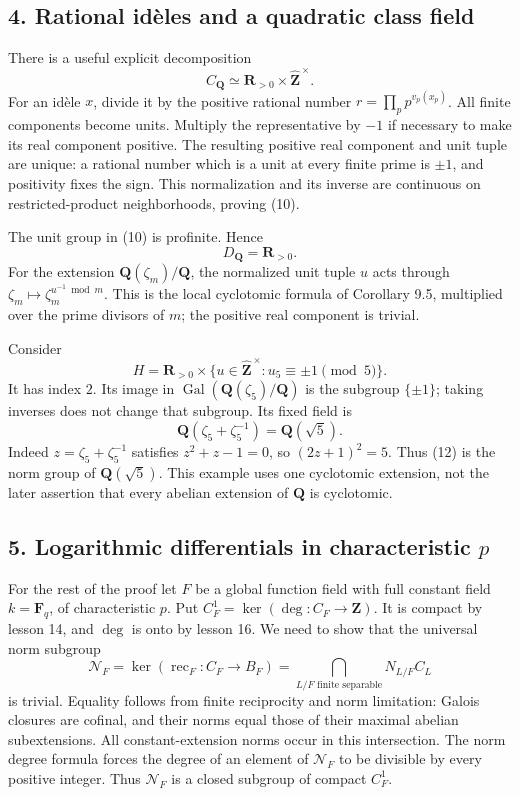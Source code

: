 \documentclass[11pt,a4paper]{article}
\begin{document}
\subsection{4. Rational idèles and a quadratic class
field}\label{rational-iduxe8les-and-a-quadratic-class-field}

There is a useful explicit decomposition \[
C_{\mathbf Q}\simeq\mathbf R_{>0}\times\widehat{\mathbf Z}^{\,\times}.
\tag{10}
\] For an idèle \(x\), divide it by the positive rational number
\(r=\prod_p p^{v_p(x_p)}\). All finite components become units. Multiply
the representative by \(-1\) if necessary to make its real component
positive. The resulting positive real component and unit tuple are
unique: a rational number which is a unit at every finite prime is
\(\pm1\), and positivity fixes the sign. This normalization and its
inverse are continuous on restricted-product neighborhoods, proving
(10).

The unit group in (10) is profinite. Hence \[
D_{\mathbf Q}=\mathbf R_{>0}.
\tag{11}
\] For the extension \(\mathbf Q(\zeta_m)/\mathbf Q\), the normalized
unit tuple \(u\) acts through \(\zeta_m\mapsto\zeta_m^{u^{-1}\bmod m}\).
This is the local cyclotomic formula of Corollary 9.5, multiplied over
the prime divisors of \(m\); the positive real component is trivial.

Consider \[
H=\mathbf R_{>0}\times
\{u\in\widehat{\mathbf Z}^{\,\times}:u_5\equiv\pm1\pmod5\}.
\tag{12}
\] It has index \(2\). Its image in
\(\operatorname{Gal}(\mathbf Q(\zeta_5)/\mathbf Q)\) is the subgroup
\(\{\pm1\}\); taking inverses does not change that subgroup. Its fixed
field is \[
\mathbf Q(\zeta_5+\zeta_5^{-1})=\mathbf Q(\sqrt5).
\tag{13}
\] Indeed \(z=\zeta_5+\zeta_5^{-1}\) satisfies \(z^2+z-1=0\), so
\((2z+1)^2=5\). Thus (12) is the norm group of \(\mathbf Q(\sqrt5)\).
This example uses one cyclotomic extension, not the later assertion that
every abelian extension of \(\mathbf Q\) is cyclotomic.

\subsection{\texorpdfstring{5. Logarithmic differentials in
characteristic
\(p\)}{5. Logarithmic differentials in characteristic p}}\label{logarithmic-differentials-in-characteristic-p}

For the rest of the proof let \(F\) be a global function field with full
constant field \(k=\mathbf F_q\), of characteristic \(p\). Put
\(C_F^1=\ker(\deg:C_F\to\mathbf Z)\). It is compact by lesson 14, and
\(\deg\) is onto by lesson 16. We need to show that the universal norm
subgroup \[
\mathcal N_F=\ker(\operatorname{rec}_F:C_F\to B_F)
=\bigcap_{L/F\text{ finite separable}}N_{L/F}C_L
\tag{14}
\] is trivial. Equality follows from finite reciprocity and norm
limitation: Galois closures are cofinal, and their norms equal those of
their maximal abelian subextensions. All constant-extension norms occur
in this intersection. The norm degree formula forces the degree of an
element of \(\mathcal N_F\) to be divisible by every positive integer.
Thus \(\mathcal N_F\) is a closed subgroup of compact \(C_F^1\).
\end{document}
